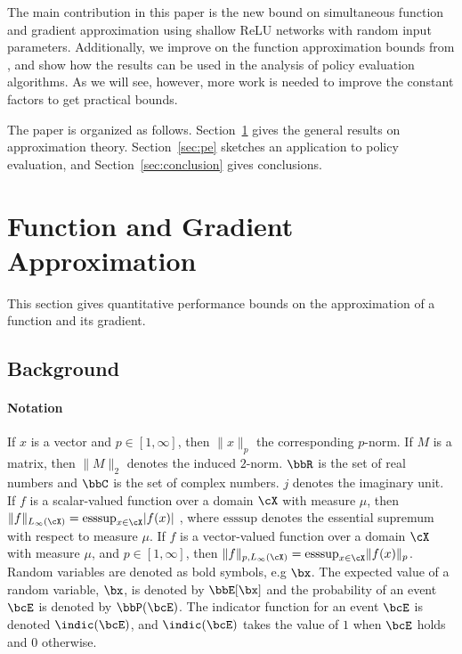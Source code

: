 \documentclass[letterpaper, 10 pt, conference]{ieeeconf}  %
\begin{document}
The main contribution in this paper is the new bound on simultaneous function and gradient approximation using shallow ReLU networks with random input parameters. Additionally, we improve on the function approximation bounds from \cite{lamperski2024approximation}, and show how the results can be used in the analysis of policy evaluation algorithms. As we will see, however, more work is needed to improve the constant factors to get practical bounds. 

The paper is organized as follows. Section~\ref{sec:approximation} gives the general results on approximation theory. Section~\ref{sec:pe} sketches an application to policy evaluation, and Section~\ref{sec:conclusion} gives conclusions. 






\section{Function and Gradient Approximation}
\label{sec:approximation}
This section gives quantitative performance bounds on the approximation of a function and its  gradient. 

\subsection{Background}

\paragraph*{Notation}
If $x$ is a vector and $p\in [1,\infty]$,  then $\|x\|_p$ the corresponding $p$-norm. If $M$ is a matrix, then $\|M\|_2$ denotes the induced $2$-norm. $\bbR$ is the set of real numbers and $\bbC$ is the set of complex numbers. $j$ denotes the imaginary unit.
If $f$ is a scalar-valued  function over a domain $\cX$ with measure $\mu$, then $\|f\|_{L_{\infty}(\cX)}=\mathrm{esssup}_{x\in\cX}|f(x)|$ , where $\mathrm{esssup}$ denotes the essential supremum with respect to measure $\mu$.
%
If $f$ is a vector-valued function over a domain $\cX$ with measure $\mu$, and $p\in [1,\infty]$, then $\|f\|_{p,L_{\infty}(\cX)}=\mathrm{esssup}_{x\in\cX}\|f(x)\|_p$. Random variables are denoted as bold symbols, e.g $\bx$. The expected value of a random variable, $\bx$,  is denoted by $\bbE[\bx]$ and the probability of an event $\bcE$ is denoted by $\bbP(\bcE)$. The indicator function for an event $\bcE$ is denoted $\indic(\bcE)$, and $\indic(\bcE)$ takes the value of $1$ when $\bcE$ holds and $0$ otherwise. 
\end{document}
